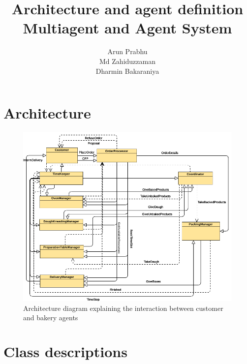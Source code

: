 \documentclass[12pt]{article}
\title{Architecture and agent definition\\Multiagent and Agent System}
\author{Arun Prabhu\\Md Zahiduzzaman\\Dharmin Bakaraniya}
\begin{document}
\maketitle{}
\pagebreak
\section{Architecture}%
\label{sec:architecture}

\begin{figure}[htpb]
    \centering
    \includegraphics[width=1.0\linewidth]{Bakery.png}
    \caption{Architecture diagram explaining the interaction between customer and bakery agents}\label{fig:somename}
\end{figure}

\pagebreak

\section{Class descriptions}%
\label{sec:agent_descriptions}
\end{document}
